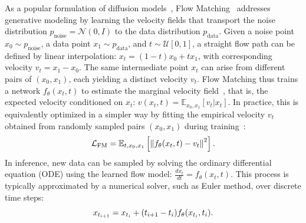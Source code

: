 As a popular formulation of diffusion models~\citep{difussion_2015,ddpm,ddim,rezende2015variational,kingma2023understanding}, Flow Matching~\citep{fm1,fm2} addresses generative modeling by learning the velocity fields that transport the noise distribution $p_{\mathrm{noise}}=\mathcal{N}(0, I)$ to the data distribution $p_{\mathrm{data}}$. Given a noise point $x_0 \sim  p_{\mathrm{noise}}$, a data point $x_1 \sim p_{\mathrm{data}}$, and $t \sim \mathcal{U}[0, 1]$, a straight flow path can be defined by linear interpolation: $x_t = (1-t) x_0 + t x_1$, with corresponding velocity $v_t = x_1 - x_0$.
The same intermediate point $x_t$ can arise from different pairs of $(x_0, x_1)$, each yielding a distinct velocity $v_t$. 
Flow Matching thus trains a network $f_{\theta}(x_t, t)$ to estimate the marginal velocity field~\citep{fm1}, that is, the expected velocity conditioned on $x_t$: $v(x_t, t) = \mathbb{E}_{x_0, x_1} [v_t | x_t]$. 
In practice, this is equivalently optimized in a simpler way by fitting the empirical velocity $v_t$ obtained from randomly sampled pairs $(x_0, x_1)$ during training~\citep{fm1}:
\begin{equation}
\label{eq:fm_loss}
\vspace{-0.5em}
\mathcal{L}_{\mathrm{FM}} = \mathbb{E}_{t,x_0,x_1} \left[\left\| f_{\theta}(x_t, t) - v_t \right\|^2\right].
\vspace{-0.3em}
\end{equation}
In inference, new data can be sampled by solving the ordinary differential equation (ODE) using the learned flow model: $\frac{d x_t}{d t}=f_{\theta}(x_t, t)$.
This process is typically approximated by a numerical solver, such as Euler method, over discrete time steps:  
\begin{equation}
\vspace{-0.7em}
\label{eq:fm_ode}
x_{t_{i+1}} = x_{t_i} + (t_{i+1} - t_i)f_{\theta}(x_{t_i}, t_i).
\vspace{-0.8em}
\end{equation}

